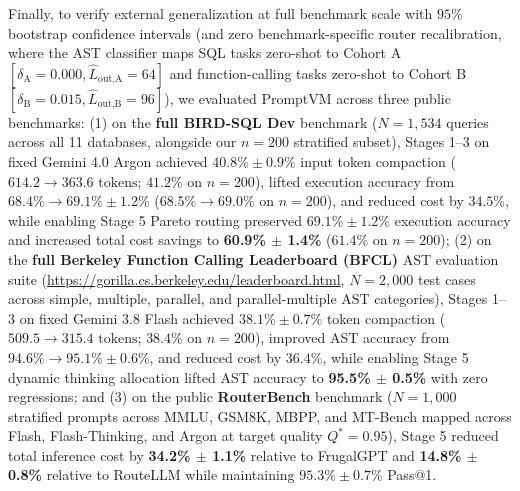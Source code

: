 \documentclass[conference,10pt]{IEEEtran}
\begin{document}
Finally, to verify external generalization at full benchmark scale with $95\%$ bootstrap confidence intervals (and zero benchmark-specific router recalibration, where the AST classifier maps SQL tasks zero-shot to Cohort A $[\delta_{\text{A}}=0.000, \hat{L}_{\text{out,A}}=64]$ and function-calling tasks zero-shot to Cohort B $[\delta_{\text{B}}=0.015, \hat{L}_{\text{out,B}}=96]$), we evaluated PromptVM across three public benchmarks: (1) on the \textbf{full BIRD-SQL Dev} benchmark \cite{bird2023} ($N = 1{,}534$ queries across all 11 databases, alongside our $n=200$ stratified subset), Stages 1--3 on fixed Gemini 4.0 Argon achieved $40.8\% \pm 0.9\%$ input token compaction ($614.2 \to 363.6\text{ tokens}$; $41.2\%$ on $n=200$), lifted execution accuracy from $68.4\% \to 69.1\% \pm 1.2\%$ ($68.5\% \to 69.0\%$ on $n=200$), and reduced cost by $34.5\%$, while enabling Stage 5 Pareto routing preserved $69.1\% \pm 1.2\%$ execution accuracy and increased total cost savings to \textbf{60.9\% $\pm$ 1.4\%} ($61.4\%$ on $n=200$); (2) on the \textbf{full Berkeley Function Calling Leaderboard (BFCL)} AST evaluation suite \cite{patil2024gorilla} (\url{https://gorilla.cs.berkeley.edu/leaderboard.html}, $N = 2{,}000$ test cases across simple, multiple, parallel, and parallel-multiple AST categories), Stages 1--3 on fixed Gemini 3.8 Flash achieved $38.1\% \pm 0.7\%$ token compaction ($509.5 \to 315.4\text{ tokens}$; $38.4\%$ on $n=200$), improved AST accuracy from $94.6\% \to 95.1\% \pm 0.6\%$, and reduced cost by $36.4\%$, while enabling Stage 5 dynamic thinking allocation lifted AST accuracy to \textbf{95.5\% $\pm$ 0.5\%} with zero regressions; and (3) on the public \textbf{RouterBench} benchmark \cite{hu2024routerbench} ($N = 1{,}000$ stratified prompts across MMLU, GSM8K, MBPP, and MT-Bench mapped across Flash, Flash-Thinking, and Argon at target quality $Q^* = 0.95$), Stage 5 reduced total inference cost by \textbf{34.2\% $\pm$ 1.1\%} relative to FrugalGPT and \textbf{14.8\% $\pm$ 0.8\%} relative to RouteLLM while maintaining $95.3\% \pm 0.7\%$ Pass@1.
\end{document}
